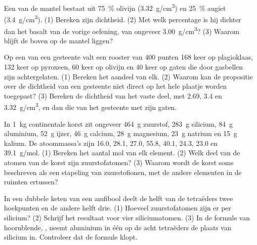 \begin{exercise}[$\star\star$]\label{exo:g11:minerals:10}
Een  van de mantel bestaat uit \qty{75}{\percent} olivijn
(\qty{3.32}{g/cm^3}) en \qty{25}{\percent} augiet (\qty{3.4}{g/cm^3}).
(1) Bereken zijn dichtheid. (2) Met welk percentage is hij dichter dan het
basalt van de vorige oefening, van ongeveer \qty{3.00}{g/cm^3}? (3) Waarom blijft
de  boven op de mantel liggen?
\end{exercise}

\begin{exercise}[$\star\star$]\label{exo:g11:minerals:11}
Op een  van een gesteente valt een rooster van 400 punten 168 keer op
plagioklaas, 132 keer op pyroxeen, 60 keer op olivijn en 40 keer op
gaten die door gasbellen zijn achtergelaten. (1) Bereken het aandeel van elk. (2) Waarom kan de
propositie over de dichtheid van een gesteente niet direct op het hele
plaatje worden toegepast? (3) Bereken de dichtheid van het vaste deel, met \qty{2.69}{},
\qty{3.4}{} en \qty{3.32}{g/cm^3}, en dan die van het gesteente met zijn gaten.
\end{exercise}

\begin{exercise}[$\star\star\star$]\label{exo:g11:minerals:12}
In \qty{1}{kg} continentale korst zit ongeveer \qty{464}{g} zuurstof,
\qty{283}{g} silicium, \qty{84}{g} aluminium, \qty{52}{g} ijzer,
\qty{46}{g} calcium, \qty{28}{g} magnesium, \qty{23}{g} natrium en
\qty{15}{g} kalium. De atoommassa's zijn \qty{16.0}{}, \qty{28.1}{},
\qty{27.0}{}, \qty{55.8}{}, \qty{40.1}{}, \qty{24.3}{}, \qty{23.0}{} en
\qty{39.1}{g/mol}. (1) Bereken het aantal mol van elk element. (2) Welk
deel van de atomen van de korst zijn zuurstofatomen? (3) Waarom wordt de korst
soms beschreven als een stapeling van zuurstofionen, met de andere elementen in
de ruimten ertussen?
\end{exercise}

\begin{exercise}[$\star\star\star$]\label{exo:g11:minerals:13}
In een dubbele keten van een amfibool deelt de helft van de tetraëders twee hoekpunten en
de andere helft drie. (1) Hoeveel zuurstofatomen zijn er per silicium? (2) Schrijf
het resultaat voor vier siliciumatomen. (3) In de formule van hoornblende,
, neemt aluminium in één op de acht tetraëders de plaats
van silicium in. Controleer dat de formule klopt.
\end{exercise}

